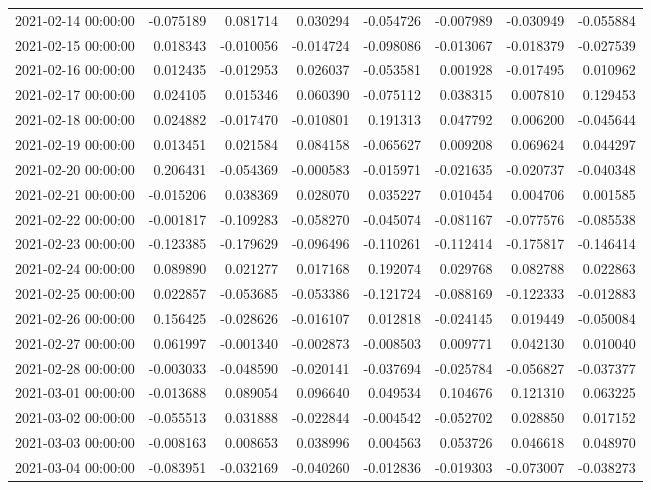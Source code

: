 \begin{tabular}{lrrrrrrr}
2021-02-14 00:00:00 & -0.075189 & 0.081714 & 0.030294 & -0.054726 & -0.007989 & -0.030949 & -0.055884 \\
2021-02-15 00:00:00 & 0.018343 & -0.010056 & -0.014724 & -0.098086 & -0.013067 & -0.018379 & -0.027539 \\
2021-02-16 00:00:00 & 0.012435 & -0.012953 & 0.026037 & -0.053581 & 0.001928 & -0.017495 & 0.010962 \\
2021-02-17 00:00:00 & 0.024105 & 0.015346 & 0.060390 & -0.075112 & 0.038315 & 0.007810 & 0.129453 \\
2021-02-18 00:00:00 & 0.024882 & -0.017470 & -0.010801 & 0.191313 & 0.047792 & 0.006200 & -0.045644 \\
2021-02-19 00:00:00 & 0.013451 & 0.021584 & 0.084158 & -0.065627 & 0.009208 & 0.069624 & 0.044297 \\
2021-02-20 00:00:00 & 0.206431 & -0.054369 & -0.000583 & -0.015971 & -0.021635 & -0.020737 & -0.040348 \\
2021-02-21 00:00:00 & -0.015206 & 0.038369 & 0.028070 & 0.035227 & 0.010454 & 0.004706 & 0.001585 \\
2021-02-22 00:00:00 & -0.001817 & -0.109283 & -0.058270 & -0.045074 & -0.081167 & -0.077576 & -0.085538 \\
2021-02-23 00:00:00 & -0.123385 & -0.179629 & -0.096496 & -0.110261 & -0.112414 & -0.175817 & -0.146414 \\
2021-02-24 00:00:00 & 0.089890 & 0.021277 & 0.017168 & 0.192074 & 0.029768 & 0.082788 & 0.022863 \\
2021-02-25 00:00:00 & 0.022857 & -0.053685 & -0.053386 & -0.121724 & -0.088169 & -0.122333 & -0.012883 \\
2021-02-26 00:00:00 & 0.156425 & -0.028626 & -0.016107 & 0.012818 & -0.024145 & 0.019449 & -0.050084 \\
2021-02-27 00:00:00 & 0.061997 & -0.001340 & -0.002873 & -0.008503 & 0.009771 & 0.042130 & 0.010040 \\
2021-02-28 00:00:00 & -0.003033 & -0.048590 & -0.020141 & -0.037694 & -0.025784 & -0.056827 & -0.037377 \\
2021-03-01 00:00:00 & -0.013688 & 0.089054 & 0.096640 & 0.049534 & 0.104676 & 0.121310 & 0.063225 \\
2021-03-02 00:00:00 & -0.055513 & 0.031888 & -0.022844 & -0.004542 & -0.052702 & 0.028850 & 0.017152 \\
2021-03-03 00:00:00 & -0.008163 & 0.008653 & 0.038996 & 0.004563 & 0.053726 & 0.046618 & 0.048970 \\
2021-03-04 00:00:00 & -0.083951 & -0.032169 & -0.040260 & -0.012836 & -0.019303 & -0.073007 & -0.038273 \\

\end{tabular}
